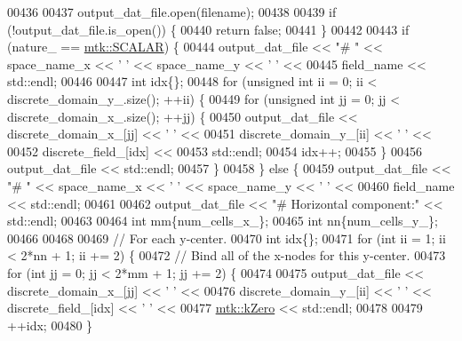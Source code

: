 \begin{DoxyCode}
00436 
00437   output\_dat\_file.open(filename);
00438 
00439   \textcolor{keywordflow}{if} (!output\_dat\_file.is\_open()) \{
00440     \textcolor{keywordflow}{return} \textcolor{keyword}{false};
00441   \}
00442 
00443   \textcolor{keywordflow}{if} (nature\_ == \hyperlink{namespacemtk_ga4c54f2a329cfb4e56213b02a259d19e2af481d45bd70d41381c7d72e200889205}{mtk::SCALAR}) \{
00444     output\_dat\_file << \textcolor{stringliteral}{"# "} << space\_name\_x <<  \textcolor{charliteral}{' '} << space\_name\_y << \textcolor{charliteral}{' '} <<
00445       field\_name << std::endl;
00446 
00447     \textcolor{keywordtype}{int} idx\{\};
00448     \textcolor{keywordflow}{for} (\textcolor{keywordtype}{unsigned} \textcolor{keywordtype}{int} ii = 0; ii < discrete\_domain\_y\_.size(); ++ii) \{
00449       \textcolor{keywordflow}{for} (\textcolor{keywordtype}{unsigned} \textcolor{keywordtype}{int} jj = 0; jj < discrete\_domain\_x\_.size(); ++jj) \{
00450         output\_dat\_file << discrete\_domain\_x\_[jj] << \textcolor{charliteral}{' '} <<
00451                            discrete\_domain\_y\_[ii] << \textcolor{charliteral}{' '} <<
00452                            discrete\_field\_[idx] <<
00453                           std::endl;
00454         idx++;
00455       \}
00456       output\_dat\_file << std::endl;
00457     \}
00458   \} \textcolor{keywordflow}{else} \{
00459     output\_dat\_file << \textcolor{stringliteral}{"# "} << space\_name\_x <<  \textcolor{charliteral}{' '} << space\_name\_y << \textcolor{charliteral}{' '} <<
00460       field\_name << std::endl;
00461 
00462     output\_dat\_file << \textcolor{stringliteral}{"# Horizontal component:"} << std::endl;
00463 
00464     \textcolor{keywordtype}{int} mm\{num\_cells\_x\_\};
00465     \textcolor{keywordtype}{int} nn\{num\_cells\_y\_\};
00466 
00468 
00469     \textcolor{comment}{// For each y-center.}
00470     \textcolor{keywordtype}{int} idx\{\};
00471     \textcolor{keywordflow}{for} (\textcolor{keywordtype}{int} ii = 1; ii < 2*nn + 1; ii += 2) \{
00472       \textcolor{comment}{// Bind all of the x-nodes for this y-center.}
00473       \textcolor{keywordflow}{for} (\textcolor{keywordtype}{int} jj = 0; jj < 2*mm + 1; jj += 2) \{
00474 
00475         output\_dat\_file << discrete\_domain\_x\_[jj] << \textcolor{charliteral}{' '} <<
00476           discrete\_domain\_y\_[ii] << \textcolor{charliteral}{' '} << discrete\_field\_[idx] << \textcolor{charliteral}{' '} <<
00477           \hyperlink{group__c01-roots_ga59a451a5fae30d59649bcda274fea271}{mtk::kZero} << std::endl;
00478 
00479         ++idx;
00480       \}

\end{DoxyCode}
